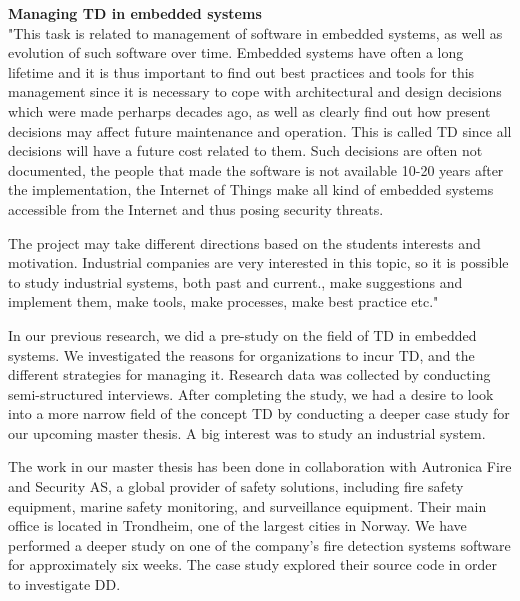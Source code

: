 \begin{addmargin}[2em]{2em}
\textbf{Managing TD in embedded systems} \\
"This task is related to management of software in embedded systems, as well as evolution of such software over time. Embedded systems have often a long lifetime and it is thus important to find out best practices and tools for this management since it is necessary to cope with architectural and design decisions which were made perharps decades ago, as well as clearly find out how present decisions may affect future maintenance and operation. This is called TD since all decisions will have a future cost related to them. Such decisions are often not documented, the people that made the software is not available 10-20 years after the implementation, the Internet of Things make all kind of embedded systems accessible from the Internet and thus posing security threats.

The project may take different directions based on the students interests and motivation. Industrial companies are very interested in this topic, so it is possible to study industrial systems, both past and current., make suggestions and implement them, make tools, make processes, make best practice etc."
\end{addmargin}

In our previous research, we did a pre-study on the field of TD in embedded systems. We investigated the reasons for organizations to incur TD, and the different strategies for managing it. Research data was collected by conducting semi-structured interviews. After completing the study, we had a desire to look into a more narrow field of the concept TD by conducting a deeper case study for our upcoming master thesis. A big interest was to study an industrial system.


The work in our master thesis has been done in collaboration with Autronica Fire and Security AS, a global provider of safety solutions, including fire safety equipment, marine safety monitoring, and surveillance equipment. Their main office is located in Trondheim, one of the largest cities in Norway. We have performed a deeper study on one of the company's fire detection systems software for approximately six weeks. The case study explored their source code in order to investigate DD. 


